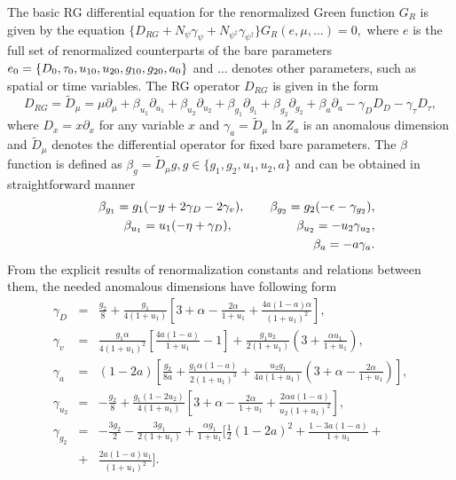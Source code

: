  The basic RG differential equation for the renormalized Green function $G_R$ is given by the equation $\{ D_{RG} + N_{\psi} \gamma_{\psi} + N_{\psi^{\dagger}} \gamma_{\psi^{\dagger}} \} G_R(e, \mu, \dots)=0,$ where $e$ is the full set of renormalized counterparts of the bare parameters $e_0 =\{D_0, \tau_0, u_{10},u_{20}, g_{10},\\ g_{20}, a_0 \}$ and $\dots$  denotes other parameters, such as spatial or time variables. The RG operator $D_{RG}$ is given in the form
\begin{equation}
D_{RG}= \tilde{D}_{\mu}  = \mu \partial_{\mu} + \beta_{u_1} \partial_{u_1} + \beta_{u_2} \partial_{u_2}+
\beta_{g_1} \partial_{g_1} + \beta_{g_2} \partial_{g_2} + \beta_{a} \partial_{a} - 
\gamma_D D_D - \gamma_{\tau} D_{\tau},
\end{equation}
where $D_x = x \partial_x$ for any variable $x$ and $\gamma_a = \tilde{D}_{\mu} \ln  Z_a$ is an anomalous dimension and $\tilde{D}_{\mu}$ denotes the differential operator for fixed bare parameters. The $\beta$ function is defined as $\beta_g = \tilde{D}_{\mu} g, g\in\{ g_1, g_2, u_1, u_2, a\}$ and can be obtained in straightforward manner
\begin{eqnarray}
& & \beta_{g_1} = g_1 (-y + 2\gamma_D-2\gamma_v), \qquad
 \beta_{g_2} = g_2 (-\epsilon -\gamma_{g_2}), \nonumber \\
& & \beta_{u_1} = u_1(-\eta +\gamma_D), \hskip1.8cm
\beta_{u_2} = - u_2 \gamma_{u_2} ,  \nonumber \\
& & \beta_{a} = - a \gamma_{a}.
\label{eq:beta_functions}
\end{eqnarray}
From the explicit results of renormalization constants and relations between them, the needed anomalous dimensions have following form
\begin{subequations}
    \label{eq:anomal_dim}
  \begin{eqnarray}  
    \gamma_D & = & \frac{g_2}{8}  + \frac{g_1}{4(1+u_1)}\left[ 3+\alpha - 
    \frac{2\alpha}{1+u_1} + \frac{4a(1-a)\alpha}{(1+u_1)^2} 
    \right], \label{eq:gammaD} 
    \\ 
    \gamma_v & = & \frac{g_1 \alpha}{4(1+u_1)^2}\left[ \frac{4a(1-a)}{1+u_1}-1 \right] 
    + \frac{g_1 u_2}{2(1+u_1)} \left( 3+\frac{\alpha u_1}{1+u_1} \right), \label{eq:gamma_v} 
    \\
    \gamma_a & = & (1-2a) \left[ \frac{g_2}{8a} + \frac{g_1\alpha(1-a)}{2(1+u_1)^3} 
    + \frac{u_2g_1}{4a(1+u_1)} \left(3+\alpha - \frac{2\alpha}{1+u_1} \right) \right], \label{eq:gamma_a}
    \\
    \gamma_{u_2} & = & - \frac{g_2}{8} + \frac{g_1(1-2u_2)}{4(1+u_1)} \left[3+\alpha -
     \frac{2 \alpha}{1+u_1} + \frac{2\alpha a(1-a)}{u_2(1+u_1)^2}\right], \label{eq:gamma_u2}
     \\
     \gamma_{g_2} & = & -\frac{3g_2}{2} -\frac{3g_1}{2(1+u_1)} +
      \frac{\alpha g_1}{1+u_1} \biggl[ \frac{1}{2}(1-2a)^2 + \frac{1-3a(1-a)}{1+u_1} +
     \nonumber \\
     & + & \frac{2a (1-a)u_1}{(1+u_1)^2} \biggl]. \label{eq:gamma_g2}
  \end{eqnarray}
\end{subequations}



